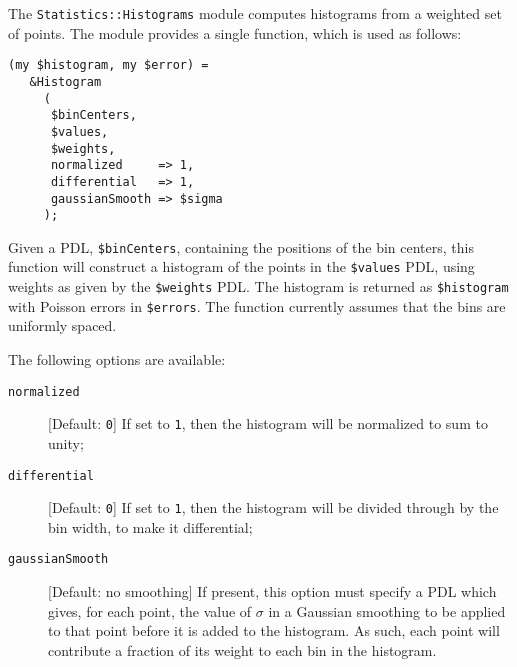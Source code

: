 The {\tt Statistics::Histograms} module computes histograms from a weighted set of points. The module provides a single function, which is used as follows:
\begin{verbatim}
(my $histogram, my $error) = 
   &Histogram
     (
      $binCenters,
      $values,
      $weights,
      normalized     => 1,
      differential   => 1,
      gaussianSmooth => $sigma
     );
\end{verbatim}
Given a PDL, {\tt \$binCenters}, containing the positions of the bin centers, this function will construct a histogram of the points in the {\tt \$values} PDL, using weights as given by the {\tt \$weights} PDL. The histogram is returned as {\tt \$histogram} with Poisson errors in {\tt \$errors}. The function currently assumes that the bins are uniformly spaced.

The following options are available:
\begin{description}
 \item [{\tt normalized}] [Default: {\tt 0}] If set to {\tt 1}, then the histogram will be normalized to sum to unity;
 \item [{\tt differential}] [Default: {\tt 0}] If set to {\tt 1}, then the histogram will be divided through by the bin width, to make it differential;
 \item[{\tt gaussianSmooth}] [Default: no smoothing] If present, this option must specify a PDL which gives, for each point, the value of $\sigma$ in a Gaussian smoothing to be applied to that point before it is added to the histogram. As such, each point will contribute a fraction of its weight to each bin in the histogram.
\end{description}
